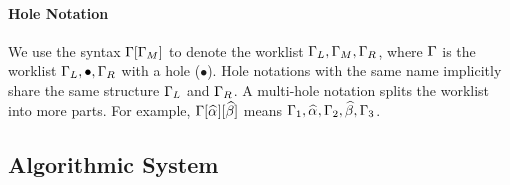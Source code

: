\paragraph{Hole Notation}
We use the syntax $\Gamma[\Gamma_M]$ to denote the worklist $\Gamma_L,\Gamma_M,\Gamma_R$,
where $\Gamma$ is the worklist $\Gamma_L,\bullet,\Gamma_R$ with a hole ($\bullet$).
Hole notations with the same name implicitly share the same structure $\Gamma_L$ and $\Gamma_R$.
A multi-hole notation splits the worklist into more parts.
For example, $\Gm[\al][\bt]$ means $\Gm_1,\al,\Gm_2,\bt,\Gm_3$.

\subsection{Algorithmic System}

\newcommand \algrule {\stepcounter{algRuleCounter}\rrule{\arabic{algRuleCounter}}}

